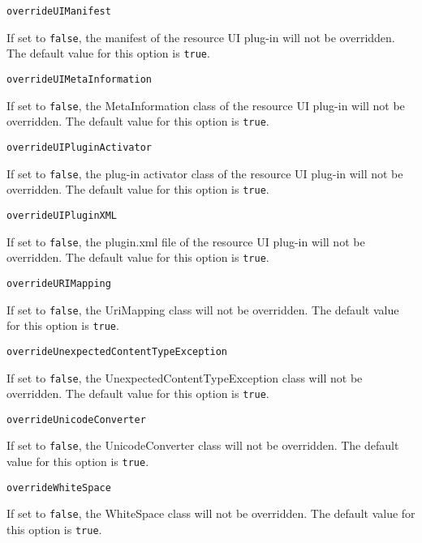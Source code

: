 \noindent\texttt{overrideUIManifest}
\begin{myindentpar}{1cm}
If set to \texttt{false}, the manifest of the resource UI plug-in will not be overridden. The default value for this option is \texttt{true}.
\end{myindentpar}

\noindent\texttt{overrideUIMetaInformation}
\begin{myindentpar}{1cm}
If set to \texttt{false}, the MetaInformation class of the resource UI plug-in will not be overridden. The default value for this option is \texttt{true}.
\end{myindentpar}

\noindent\texttt{overrideUIPluginActivator}
\begin{myindentpar}{1cm}
If set to \texttt{false}, the plug-in activator class of the resource UI plug-in will not be overridden. The default value for this option is \texttt{true}.
\end{myindentpar}

\noindent\texttt{overrideUIPluginXML}
\begin{myindentpar}{1cm}
If set to \texttt{false}, the plugin.xml file of the resource UI plug-in will not be overridden. The default value for this option is \texttt{true}.
\end{myindentpar}

\noindent\texttt{overrideURIMapping}
\begin{myindentpar}{1cm}
If set to \texttt{false}, the UriMapping class will not be overridden. The default value for this option is \texttt{true}.
\end{myindentpar}

\noindent\texttt{overrideUnexpectedContentTypeException}
\begin{myindentpar}{1cm}
If set to \texttt{false}, the UnexpectedContentTypeException class will not be overridden. The default value for this option is \texttt{true}.
\end{myindentpar}

\noindent\texttt{overrideUnicodeConverter}
\begin{myindentpar}{1cm}
If set to \texttt{false}, the UnicodeConverter class will not be overridden. The default value for this option is \texttt{true}.
\end{myindentpar}

\noindent\texttt{overrideWhiteSpace}
\begin{myindentpar}{1cm}
If set to \texttt{false}, the WhiteSpace class will not be overridden. The default value for this option is \texttt{true}.
\end{myindentpar}

